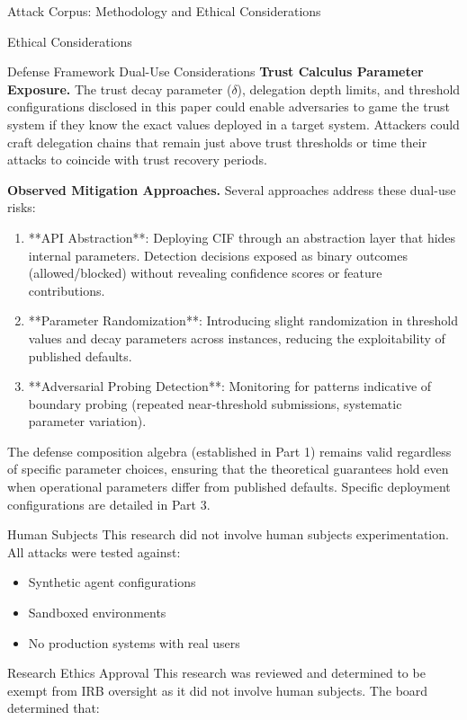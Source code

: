 \documentclass[
  ignorenonframetext,
]{beamer}
\begin{document}
\begin{frame}{Attack Corpus: Methodology and Ethical Considerations}
\begin{block}{Ethical Considerations}
\begin{block}{Defense Framework Dual-Use Considerations}
\textbf{Trust Calculus Parameter Exposure.} The trust decay parameter
(\(\delta\)), delegation depth limits, and threshold configurations
disclosed in this paper could enable adversaries to game the trust
system if they know the exact values deployed in a target system.
Attackers could craft delegation chains that remain just above trust
thresholds or time their attacks to coincide with trust recovery
periods.

\textbf{Observed Mitigation Approaches.} Several approaches address
these dual-use risks:

\begin{enumerate}
\item **API Abstraction**: Deploying CIF through an abstraction layer that hides internal parameters. Detection decisions exposed as binary outcomes (allowed/blocked) without revealing confidence scores or feature contributions.
\item **Parameter Randomization**: Introducing slight randomization in threshold values and decay parameters across instances, reducing the exploitability of published defaults.
\item **Adversarial Probing Detection**: Monitoring for patterns indicative of boundary probing (repeated near-threshold submissions, systematic parameter variation).
\end{enumerate}

The defense composition algebra (established in Part 1) remains valid
regardless of specific parameter choices, ensuring that the theoretical
guarantees hold even when operational parameters differ from published
defaults. Specific deployment configurations are detailed in Part 3.
\end{block}

\begin{block}{Human Subjects}
\protect{}\label{sec:human-subjects}
This research did not involve human subjects experimentation. All
attacks were tested against:

\begin{itemize}
\item Synthetic agent configurations
\item Sandboxed environments
\item No production systems with real users
\end{itemize}
\end{block}

\begin{block}{Research Ethics Approval}
\protect{}\label{sec:ethics-approval}
This research was reviewed and determined to be exempt from IRB
oversight as it did not involve human subjects. The board determined
that:


\end{block}
\end{block}
\end{frame}
\end{document}
